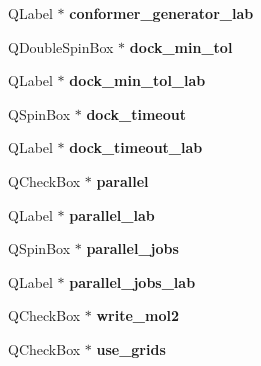 \begin{DoxyCompactItemize}
\item 
\hypertarget{classDockWidget_a6dc521174a9c269f18b871faaf7cd381}{
QLabel $\ast$ {\bfseries conformer\_\-generator\_\-lab}}
\label{classDockWidget_a6dc521174a9c269f18b871faaf7cd381}

\item 
\hypertarget{classDockWidget_a3cba56e9b6e8eefba124e98f57c17778}{
QDoubleSpinBox $\ast$ {\bfseries dock\_\-min\_\-tol}}
\label{classDockWidget_a3cba56e9b6e8eefba124e98f57c17778}

\item 
\hypertarget{classDockWidget_a42b1160c1fa1595a5b7a7f6815555a73}{
QLabel $\ast$ {\bfseries dock\_\-min\_\-tol\_\-lab}}
\label{classDockWidget_a42b1160c1fa1595a5b7a7f6815555a73}

\item 
\hypertarget{classDockWidget_a3475c8e79df6f283e3271928dcfc9f31}{
QSpinBox $\ast$ {\bfseries dock\_\-timeout}}
\label{classDockWidget_a3475c8e79df6f283e3271928dcfc9f31}

\item 
\hypertarget{classDockWidget_aa356857fe8e82bbe6b6dcf5a3da430a7}{
QLabel $\ast$ {\bfseries dock\_\-timeout\_\-lab}}
\label{classDockWidget_aa356857fe8e82bbe6b6dcf5a3da430a7}

\item 
\hypertarget{classDockWidget_a2a0c5d7cdbe2ea46d77a56f4dc8d30cd}{
QCheckBox $\ast$ {\bfseries parallel}}
\label{classDockWidget_a2a0c5d7cdbe2ea46d77a56f4dc8d30cd}

\item 
\hypertarget{classDockWidget_a413529d990f552b0c1294758dac84888}{
QLabel $\ast$ {\bfseries parallel\_\-lab}}
\label{classDockWidget_a413529d990f552b0c1294758dac84888}

\item 
\hypertarget{classDockWidget_ae3dfc953043ff12ad5767f8b001c2ef2}{
QSpinBox $\ast$ {\bfseries parallel\_\-jobs}}
\label{classDockWidget_ae3dfc953043ff12ad5767f8b001c2ef2}

\item 
\hypertarget{classDockWidget_a7c59e3a70c5573911955d0c47834d0b4}{
QLabel $\ast$ {\bfseries parallel\_\-jobs\_\-lab}}
\label{classDockWidget_a7c59e3a70c5573911955d0c47834d0b4}

\item 
\hypertarget{classDockWidget_a4ab39a8bb178938fad3b3dc966dec0d3}{
QCheckBox $\ast$ {\bfseries write\_\-mol2}}
\label{classDockWidget_a4ab39a8bb178938fad3b3dc966dec0d3}

\item 
\hypertarget{classDockWidget_acae9af4a0fd0eaa9c31e6f9f80985c08}{
QCheckBox $\ast$ {\bfseries use\_\-grids}}
\label{classDockWidget_acae9af4a0fd0eaa9c31e6f9f80985c08}


\end{DoxyCompactItemize}
